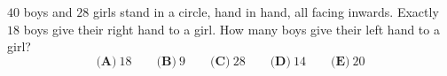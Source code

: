 $40$ boys and $28$ girls stand in a circle, hand in hand, all facing inwards. Exactly $18$ boys give their right hand to a girl. How many boys give their left hand to a girl?
\[\textbf{(A)}\ 18\qquad\textbf{(B)}\ 9\qquad\textbf{(C)}\ 28\qquad\textbf{(D)}\ 14\qquad\textbf{(E)}\ 20\]
